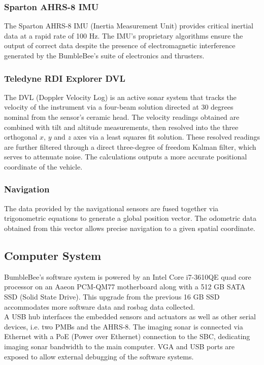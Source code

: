 \documentclass[journal,12pt]{IEEEtran}
\begin{document}
\subsubsection{Sparton AHRS-8 IMU}
The Sparton AHRS-8 IMU (Inertia Measurement Unit) provides critical inertial data at a rapid rate of 100 Hz. The IMU's proprietary algorithms ensure the output of correct data despite the presence of electromagnetic interference generated by the BumbleBee's suite of electronics and
thrusters. \\

\subsubsection{Teledyne RDI Explorer DVL}
The DVL (Doppler Velocity Log) is an active sonar system that tracks the velocity of
the instrument via a four-beam solution directed at 30 degrees nominal from the
sensor's ceramic head. The velocity readings obtained are combined with tilt and altitude measurements, then resolved into the three orthogonal $x$, $y$ and $z$ axes via a least squares fit solution. These resolved readings are further filtered through a direct three-degree of freedom Kalman filter, which serves to attenuate noise. The calculations outputs a more accurate positional coordinate of the vehicle. \\ 

\subsubsection{Navigation}
The data provided by the navigational sensors are fused together via
trigonometric equations to generate a global position vector. The odometric data obtained from this vector allows precise navigation to a given spatial coordinate.

\subsection{Computer System}
BumbleBee's software system is powered by an Intel Core i7-3610QE quad core processor on an Aaeon PCM-QM77 motherboard along with a 512 GB SATA SSD (Solid State Drive). This upgrade from the previous 16 GB SSD accommodates more software data and rosbag data collected. \\

A USB hub interfaces the embedded sensors and actuators as well as other serial devices, i.e. two PMBs and the AHRS-8. The imaging sonar is connected via Ethernet with a PoE (Power over Ethernet) connection to the SBC, dedicating imaging sonar bandwidth to the main computer. VGA and USB ports are exposed to allow external debugging of the software systems. \\
\end{document}
